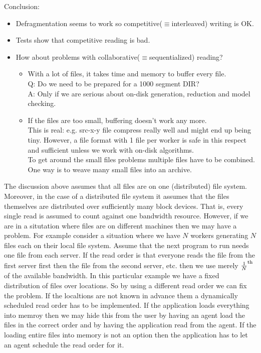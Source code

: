 \documentclass{article}
\begin{document}
Conclusion:
\begin{itemize}
\item Defragmentation seems to work so competitive($\equiv$interleaved) writing is OK.
\item Tests show that competitive reading is bad.
\item How about problems with collaborative($\equiv$sequentialized) reading?
\begin{itemize}
\item With a lot of files, it takes time and memory to buffer every file.
\\
Q: Do we need to be prepared for a 1000 segment DIR?
\\
A: Only if we are serious about on-disk generation, reduction and model checking.
\item If the files are too small, buffering doesn't work any more.
\\
This is real: e.g. src-x-y file compress really well and might end up being tiny.
However, a file format with 1 file per worker is safe in this respect and
sufficient unless we work with on-disk algorithms.
\\
To get around the small files problems multiple files have to be combined.
One way is to weave many small files into an archive.
\end{itemize}
\end{itemize}

\bigskip

The discussion above assumes that all files are on one (distributed) file system.
Moreover, in the case of a distributed file system it assumes that the files
themselves are distributed over sufficiently many block devices. That is,
every single read is assumed to count against one bandwidth resource.
However, if we are in a situtation where files are on different machines then
we may have a problem. For example consider a situation where we have $N$
workers generating $N$ files each on their local file system. Assume that
the next program to run needs one file from each server. If the read order
is that everyone reads the file from the first server first then the file from
the second server, etc. then we use merely $\frac{1}{N}^{\rm th}$ of the available
bandwidth. In this particular example we have a fixed distribution of
files over locations. So by using a different read order we can fix the problem.
If the localtions are not known in advance them a dynamically scheduled
read order has to be implemented. If the application loads everything into
memroy then we may hide this from the user by having an agent load the
files in the correct order and by having the  application read from
the agent. If the loading entire files into memory is not an option
then the application has to let an agent schedule the read order for it.
\end{document}
